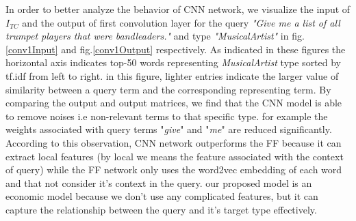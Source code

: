In order to better analyze the behavior of CNN network, we visualize the input of $I_{TC}$ and the output of first convolution layer for the query \textit{"Give me a list of all trumpet players that were bandleaders."} and type \textit{"MusicalArtist"} in fig.\ref{conv1Input} and fig.\ref{conv1Output} respectively. As indicated in these figures the horizontal axis indicates top-50 words representing \textit{MusicalArtist} type sorted by tf.idf from left to right. in this figure, lighter entries indicate the larger value of similarity between a query term and the corresponding representing term. By comparing the output and output matrices, we find that the CNN model is able to remove noises i.e non-relevant terms to that specific type. for example the weights associated with query terms "\textit{give}" and "\textit{me}" are reduced significantly. According to this observation, CNN network outperforms the FF because it can extract local features (by local we means the feature associated with the context of query) while the FF network only uses the word2vec embedding of each word and that not consider it's context in the query. our proposed model is an economic model because we don't use any complicated features, but it can capture the relationship between the query and it's target type effectively.     




\begin{table}[]
	\caption{Target type detection performance.}
\end{table}


